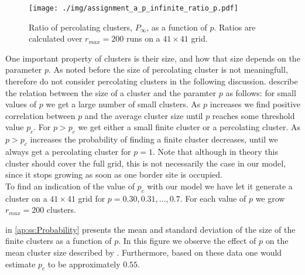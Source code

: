 \begin{figure}%
	\centering
	\texttt{[image: ./img/assignment\_a\_p\_infinite\_ratio\_p.pdf]}
	\caption{Ratio of percolating clusters, $P_\infty$, as a function of $p$. Ratios are calculated over $r_{max} = 200$ runs on a $41 \times 41$ grid.}
	\label{fig:experiment:prob:p_inf_ratio}
\end{figure}



One important property of clusters is their size, and how that size depends on the parameter $p$. As noted before the size of percolating cluster is not meaningfull, therefore do not consider percolating clusters in the following discussion. \textcite{kenzel1997physics} describe the relation between the size of a cluster and the paramter $p$ as follows: for small values of $p$ we get a large number of small clusters. As $p$ increases we find positive correlation between $p$ and the average cluster size until $p$ reaches some threshold value $p_c$. For $p > p_c$ we get either a small finite cluster or a percolating cluster. As $p > p_c$ increases the probability of finding a finite cluster decreases, until we always get a percolating cluster for $p =1 $. Note that although in theory this cluster should cover the full grid, this is not necessarily the case in our model, since it stops growing as soon as one border site is occupied.\\

To find an indication of the value of $p_c$ with our model we have let it generate a cluster on a $41 \times 41$ grid for $p = 0.30, 0.31, \dotsc, 0.7$. For each value of $p$ we grow $r_{max} = 200$ clusters. 

 in \cref{ap:ss:Probability} presents the mean and standard deviation of the size of the finite clusters as a function of $p$. In this figure we observe the effect of $p$ on the mean cluster size described by \citeauthor{kenzel1997physics}. Furthermore, based on these data one would estimate $p_c$ to be approximately $0.55$. 


